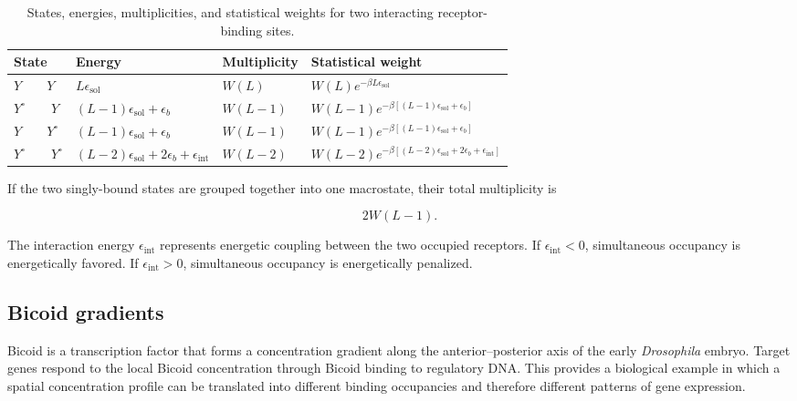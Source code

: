 \begin{table}[h!]
\centering
\renewcommand{\arraystretch}{1.5}
\begin{tabularx}{\textwidth}{
    |>{\centering\arraybackslash}p{2.5cm}
    |>{\raggedright\arraybackslash}X
    |>{\centering\arraybackslash}p{2.5cm}
    |>{\raggedright\arraybackslash}X|
}
\hline
\textbf{State} & \textbf{Energy} & \textbf{Multiplicity} & \textbf{Statistical weight}
\\
\hline
$Y \qquad Y$ &
$L\epsilon_{\mathrm{sol}}$ &
$W(L)$ &
$W(L)e^{-\beta L\epsilon_{\mathrm{sol}}}$
\\
\hline
$Y^{\circ} \qquad Y$ &
$(L-1)\epsilon_{\mathrm{sol}}+\epsilon_b$ &
$W(L-1)$ &
$W(L-1)e^{-\beta[(L-1)\epsilon_{\mathrm{sol}}+\epsilon_b]}$
\\
\hline
$Y \qquad Y^{\circ}$ &
$(L-1)\epsilon_{\mathrm{sol}}+\epsilon_b$ &
$W(L-1)$ &
$W(L-1)e^{-\beta[(L-1)\epsilon_{\mathrm{sol}}+\epsilon_b]}$
\\
\hline
$Y^{\circ} \qquad Y^{\circ}$ &
$(L-2)\epsilon_{\mathrm{sol}}+2\epsilon_b+\epsilon_{\mathrm{int}}$ &
$W(L-2)$ &
$W(L-2)e^{-\beta[(L-2)\epsilon_{\mathrm{sol}}+2\epsilon_b+\epsilon_{\mathrm{int}}]}$
\\
\hline
\end{tabularx}
\caption{States, energies, multiplicities, and statistical weights for two interacting receptor-binding sites.}
\end{table}

If the two singly-bound states are grouped together into one macrostate, their total multiplicity is

\begin{equation}
    2W(L-1).
\end{equation}

The interaction energy $\epsilon_{\mathrm{int}}$ represents energetic coupling between the two occupied receptors.
If $\epsilon_{\mathrm{int}}<0$, simultaneous occupancy is energetically favored.
If $\epsilon_{\mathrm{int}}>0$, simultaneous occupancy is energetically penalized.


\subsection{Bicoid gradients}

Bicoid is a transcription factor that forms a concentration gradient along the anterior--posterior axis of the early \textit{Drosophila} embryo.
Target genes respond to the local Bicoid concentration through Bicoid binding to regulatory DNA.
This provides a biological example in which a spatial concentration profile can be translated into different binding occupancies and therefore different patterns of gene expression.


